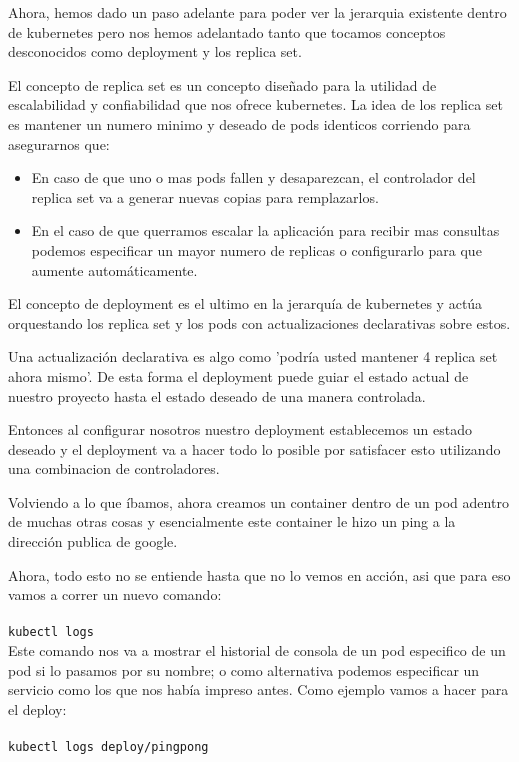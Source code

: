\documentclass[11pt]{article} %
\begin{document}
Ahora, hemos dado un paso adelante para poder ver la jerarquia existente dentro de kubernetes pero nos hemos adelantado tanto que tocamos conceptos desconocidos como deployment y los replica set.

El concepto de replica set es un concepto diseñado para la utilidad de escalabilidad y confiabilidad que nos ofrece kubernetes. La idea de los replica set es mantener un numero minimo y deseado de pods identicos corriendo para asegurarnos que:
\begin{itemize}
    
	\item    
    En caso de que uno o mas pods fallen y desaparezcan, el controlador del replica set va a generar nuevas copias para remplazarlos.
    
	\item	
	En el caso de que querramos escalar la aplicación para recibir mas consultas podemos especificar un mayor numero de replicas o configurarlo para que aumente automáticamente.
\end{itemize}


El concepto de deployment es el ultimo en la jerarquía de kubernetes y actúa orquestando los replica set y los pods con actualizaciones declarativas sobre estos.

Una actualización declarativa es algo como 'podría usted mantener 4 replica set ahora mismo'. De esta forma el deployment puede guiar el estado actual de nuestro proyecto hasta el estado deseado de una manera controlada.

Entonces al configurar nosotros nuestro deployment establecemos un estado deseado y el deployment va a hacer todo lo posible por satisfacer esto utilizando una combinacion de controladores.

Volviendo a lo que íbamos, ahora creamos un container dentro de un pod adentro de muchas otras cosas y esencialmente este container le hizo un ping a la dirección publica de google.

Ahora, todo esto no se entiende hasta que no lo vemos en acción, asi que para eso vamos a correr un nuevo comando:\\ \\
    \texttt{kubectl logs} \\ 

Este comando nos va a mostrar el historial de consola de un pod especifico de un pod si lo pasamos por su nombre; o como alternativa podemos especificar un servicio como los que nos había impreso antes. Como ejemplo vamos a hacer para el deploy: \\ \\
    \texttt{kubectl logs deploy/pingpong} \\ \\
\end{document}
